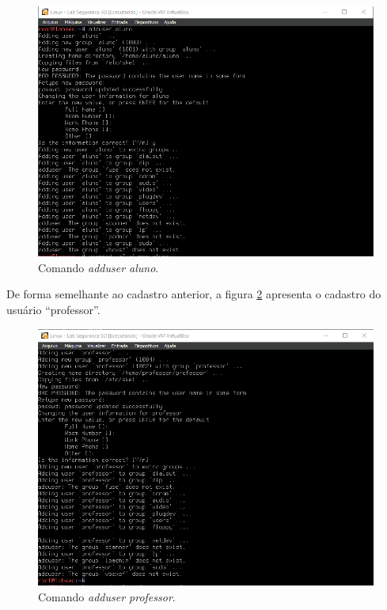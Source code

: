 \documentclass[
  12pt,				%
  oneside,   	        %
  a4paper,			%
  english,			%
  french,				%
  spanish,			%
  brazil,				%
  ]{pacotes/abntex2}
\begin{document}
\begin{figure}[H]
  \centering
  \includegraphics[scale=0.8]{figuras/adduser_aluno.png}
  \caption{Comando \textit{adduser aluno}.}
  \label{fig:add_aluno}
\end{figure}

De forma semelhante ao cadastro anterior, a figura \ref{fig:add_prof} apresenta o cadastro do usuário ``professor''.

\begin{figure}[H]
  \centering
  \includegraphics[scale=0.8]{figuras/adduser_prof.png}
  \caption{Comando \textit{adduser professor}.}
  \label{fig:add_prof}
\end{figure}
\end{document}
